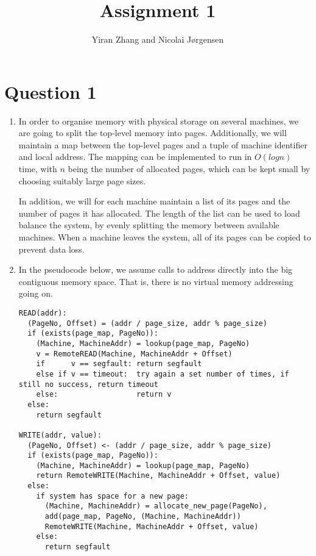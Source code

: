 \documentclass[11pt]{article}
\title          {Assignment 1}
\author         {Yiran Zhang and Nicolai Jørgensen}
\begin{document}
\maketitle
\newpage

\section{Question 1}

\begin{enumerate}

  \item
    In order to organise memory with physical storage on several machines, we are
    going to split the top-level memory into pages. Additionally, we will maintain a
    map between the top-level pages and a tuple of machine identifier and local
    address. The mapping can be implemented to run in $O(log n)$ time, with $n$ being the
    number of allocated pages, which can be kept small by choosing suitably large
    page sizes.

    In addition, we will for each machine maintain a list of its pages and the
    number of pages it has allocated. The length of the list can be used to load
    balance the system, by evenly splitting the memory between available machines.
    When a machine leaves the system, all of its pages can be copied to prevent data
    loss.

  \item
    In the pseudocode below, we assume calls to address directly into the big
    contiguous memory space. That is, there is no virtual memory addressing going
    on.
\begin{Verbatim}
READ(addr):
  (PageNo, Offset) = (addr / page_size, addr % page_size)
  if (exists(page_map, PageNo)):
    (Machine, MachineAddr) = lookup(page_map, PageNo)
    v = RemoteREAD(Machine, MachineAddr + Offset)
    if      v == segfault: return segfault
    else if v == timeout:  try again a set number of times, if still no success, return timeout
    else:                  return v
  else:
    return segfault

WRITE(addr, value):
  (PageNo, Offset) <- (addr / page_size, addr % page_size)
  if (exists(page_map, PageNo)):
    (Machine, MachineAddr) = lookup(page_map, PageNo)
    return RemoteWRITE(Machine, MachineAddr + Offset, value)
  else:
    if system has space for a new page:
      (Machine, MachineAddr) = allocate_new_page(PageNo),
      add(page_map, PageNo, (Machine, MachineAddr))
      RemoteWRITE(Machine, MachineAddr + Offset, value)
    else:
      return segfault


\end{Verbatim}
\end{enumerate}
\end{document}
